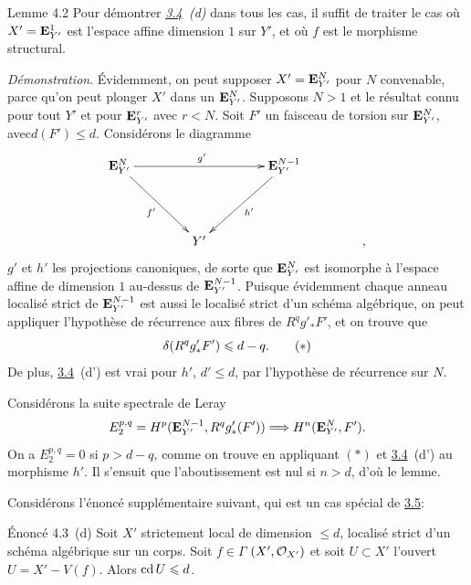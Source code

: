 \documentclass[10pt]{../fichiers-configuration-latex/smfart}
\begin{document}
\begin{enonce*}{Lemme 4.2}
Pour démontrer \emph{\hyperref[XIV.cor3.4]{3.4}~(d)} dans tous les cas, il suffit de traiter
le cas où $X'=\mathbf{E}^{1}_{Y'}$ est l'espace affine dimension $1$
sur $Y'$, et où $f$ est le morphisme structural.
\end{enonce*}

\noindent
\emph{Démonstration}. Évidemment, on peut supposer
$X'=\mathbf{E}^{N}_{Y'}$ pour $N$ convenable, parce qu'on peut plonger
$X'$ dans un $\mathbf{E}^{N}_{Y'}$. Supposons $N>1$ et le résultat
connu pour tout $Y'$ et pour $\mathbf{E}^{r}_{Y'}$ avec $r<N$. Soit
$F'$ un faisceau de torsion sur $\mathbf{E}^{N}_{Y'}$,
avec\pageoriginale $d(F')\leq d$. Considérons le diagramme
$$
\xymatrix@=1.5cm{
\EE^{N}_{Y'} \ar[rd]_{f'}       \ar[rr]^{g'}&      &
\EE^{N-1}_{Y'} \ar[ld]^{h'}\\
                       & Y' & &,
}
$$
$g'$ et $h'$ les projections canoniques, de sorte que
$\mathbf{E}^{N}_{Y'}$ est isomorphe à l'espace affine de dimension $1$
au-dessus de $\mathbf{E}^{N-1}_{Y'}$. Puisque évidemment chaque anneau
localisé strict de $\mathbf{E}^{N-1}_{Y'}$ est aussi le localisé
strict d'un schéma algébrique, on peut appliquer l'hypothèse de
récurrence aux fibres de $R^{q}g'_{\ast}F'$, et on trouve que
\begin{equation*}
\delta(R^{q}g'_{\ast}F')\leqslant d-q{}.\tag{$\ast$}
\end{equation*}
De plus, \hyperref[XIV.cor3.4]{3.4}~(d') est vrai pour $h'$, $d'\leq d$, par
l'hypothèse de récurrence sur $N$.

Considérons la suite spectrale de Leray
$$
E^{p,q}_2=H^{p}(\mathbf{E}^{N-1}_{Y'}, R^{q}
g'_{\ast}(F'))\Longrightarrow H^{n}(\mathbf{E}^{N}_{Y'}, F'){}.
$$
On a $E^{p,q}_2=0$ si $p>d-q$, comme on trouve en appliquant $(\ast)$
et \hyperref[XIV.cor3.4]{3.4}~(d') au morphisme $h'$. Il s'ensuit que l'aboutissement
est nul si $n>d$, d'où le lemme.

Considérons l'énoncé supplémentaire suivant, qui est un cas spécial de \hyperref[XIV.cor3.5]{3.5}:

\begin{enonce*}{Énoncé 4.3~(d)}
Soit $X'$ strictement local de dimension $\leq d$, localisé strict
d'un schéma algébrique sur un corps. Soit $f\in \Gamma$
$(X',{\mathcal O}_{X'})$ et soit $U\subset X'$ l'ouvert $U=X'-V(f)$. 
Alors $\operatorname{cd} U\leqslant d$.
\end{enonce*}
\end{document}
